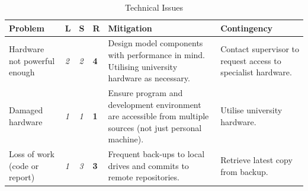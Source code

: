 \documentclass[12pt]{article}
\begin{document}
	\begin{table}[h!]
		\centering
		\caption{Technical Issues}
		\label{table:risk2}
		\footnotesize
		\begin{tabular}{|>{\centering}m{1.5in} |>{\centering}m{0.1in} |>{\centering}m{0.1in} |>{\centering}m{0.3in} |>{\centering}m{1.8in} |>{\centering\arraybackslash}m{1.8in}|}
			\hline
			\textbf{Problem}              & \textbf{L}                         & \textbf{S}                         & \textbf{R}                         & \textbf{Mitigation}                                                                                          & \textbf{Contingency}                                         \\ \hline
			Hardware not powerful enough  & \cellcolor[HTML]{F8FF00}\textit{2} & \cellcolor[HTML]{F8FF00}\textit{2} & \cellcolor[HTML]{F8FF00}\textbf{4} & Design model components with performance in mind. Utilising university hardware as necessary.                & Contact supervisor to request access to specialist hardware. \\ \hline
			Damaged hardware              & \cellcolor[HTML]{ABCB00}\textit{1} & \cellcolor[HTML]{ABCB00}\textit{1} & \cellcolor[HTML]{ABCB00}\textbf{1} & Ensure program and development environment are accessible from multiple sources (not just personal machine). & Utilise university hardware.                                 \\ \hline
			Loss of work (code or report) & \cellcolor[HTML]{ABCB00}\textit{1} & \cellcolor[HTML]{FFC702}\textit{3} & \cellcolor[HTML]{F8FF00}\textbf{3} & Frequent back-ups to local drives and commits to remote repositories.                                        & Retrieve latest copy from backup.                            \\ \hline
		\end{tabular}
	\end{table}
	
\end{document}

